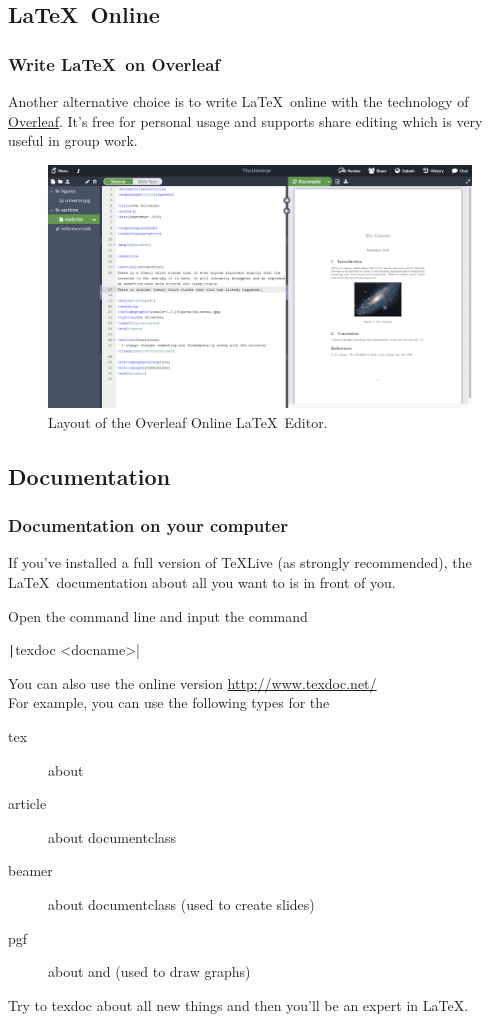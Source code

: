 \subsection{\LaTeX\ Online}

\begin{frame}
	\frametitle{Write \LaTeX\ on Overleaf}

	Another alternative choice is to write \LaTeX\ online with the technology of \href{https://www.overleaf.com/}{Overleaf}. It's free for personal usage and supports share editing which is very useful in group work.
	\begin{figure}
	\centering
	\includegraphics[width=0.7\linewidth]{overleaf.png}
	\caption{Layout of the Overleaf Online \LaTeX\ Editor.}
	\end{figure}
\end{frame}

\subsection{Documentation}

\begin{frame}[fragile]
	\frametitle{Documentation on your computer}
	If you've installed a full version of \TeX Live (as strongly recommended), the \LaTeX\ documentation about all you want to is in front of you. 
	\smallskip
	
	Open the command line and input the command \smallskip
	
	\texttt|texdoc <docname>| \smallskip
	
	You can also use the online version \url{http://www.texdoc.net/}\\[0.5em]
	For example, you can use the following types for the 
	\begin{description}
		\item[tex] 		about \structure{\TeX}
		\item[article] 	about documentclass 
		\item[beamer] 	about documentclass  (used to create slides)
		\item[pgf]		about  and  (used to draw graphs)
	\end{description}
	\smallskip
	Try to \alert{texdoc} about all new things and then you'll be an expert in \LaTeX.
\end{frame}

